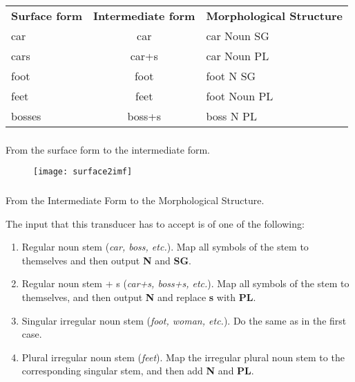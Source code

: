 \begin{frame}

	\frametitle{\insertsection}
	\framesubtitle{\insertsubsection}
	
	\begin{table}
		\centering
		\begin{tabular}{ l | c | l }
			\rowcolor{Gray}
			\textbf{Surface form} & \textbf{Intermediate form} & \textbf{Morphological Structure} \\
			\rowcolor{LightGray} car & car & car Noun SG \\
			\rowcolor{LightGray} cars & car+s & car Noun PL \\
			\rowcolor{LightGray} foot & foot & foot N SG \\
			\rowcolor{LightGray} feet & feet & foot Noun PL \\
			\rowcolor{LightGray} bosses & boss+s & boss N PL \\
		\end{tabular}
	\end{table}

\end{frame}


\begin{frame}

	\frametitle{\insertsection}
	\framesubtitle{\insertsubsection}
	
	From the surface form to the intermediate form.
	
	\begin{figure}
		\texttt{[image: surface2imf]}
	\end{figure}

\end{frame}



\begin{frame}

	\frametitle{\insertsection}
	\framesubtitle{\insertsubsection}
	
	From the Intermediate Form to the Morphological Structure.
	
	The input that this transducer has to accept is of one of the following:
	
	\begin{enumerate}
		\item Regular noun stem (\textit{car, boss, etc.}). Map all symbols of the stem to themselves and then output \textbf{N} and \textbf{SG}.
		\item Regular noun stem + s (\textit{car+s, boss+s, etc.}). Map all symbols of the stem to themselves, and then output \textbf{N} and replace \textbf{s} with \textbf{PL}.
		\item Singular irregular noun stem (\textit{foot, woman, etc.}). Do the same as in the first case.
		\item Plural irregular noun stem (\textit{feet}). Map the irregular plural noun stem to the corresponding singular stem, and then add \textbf{N} and \textbf{PL}.
	\end{enumerate}

\end{frame}


